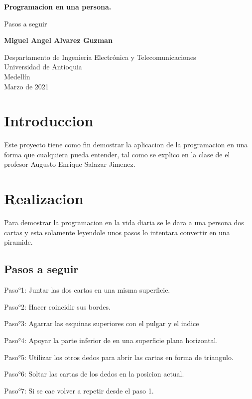 \documentclass{article}
\begin{document}
\begin{titlepage}
    \begin{center}
        \vspace*{0cm}
            
        \Huge
        \textbf{Programacion en una persona.}
            
        \vspace{0.5cm}
        \LARGE
        Pasos a seguir
            
        \vspace{1cm}
            
        \textbf{Miguel Angel Alvarez Guzman}
            
        \vfill
            
            
        \Large
        Despartamento de Ingeniería Electrónica y Telecomunicaciones\\
        Universidad de Antioquia\\
        Medellín\\
        Marzo de 2021
            
    \end{center}
\end{titlepage}

\tableofcontents
\newpage
\section{Introduccion}\label{intro}
Este proyecto tiene como fin demostrar la aplicacion de la programacion en una forma que cualquiera pueda entender, tal como se explico en la clase de el profesor Augusto Enrique Salazar Jimenez.

\section{Realizacion} \label{contenido}
Para demostrar la programacion en la vida diaria se le dara a una persona dos cartas y esta solamente leyendole unos pasos lo intentara convertir en una piramide.
\subsection{Pasos a seguir}
%
Paso°1: Juntar las dos cartas en una misma superficie.

Paso°2: Hacer coincidir sus bordes.

Paso°3: Agarrar las esquinas superiores con el pulgar y el indice

Paso°4: Apoyar la parte inferior de en una superficie plana horizontal.

Paso°5: Utilizar los otros dedos para abrir las cartas en forma de triangulo.

Paso°6: Soltar las cartas de los dedos en la posicion actual.

Paso°7: Si se cae volver a repetir desde el paso 1.
\end{document}
